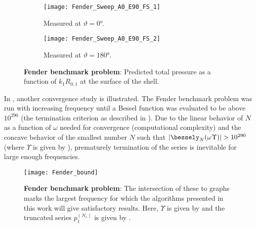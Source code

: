 \begin{figure}
	\centering
	\begin{subfigure}[t]{\textwidth}
		\centering
		\texttt{[image: Fender\_Sweep\_A0\_E90\_FS\_1]}
		\caption{Measured at $\vartheta = \ang{0}$.}
		\label{Fig1:Fender1}
	\end{subfigure}
	\par\bigskip
	\begin{subfigure}[t]{\textwidth}
		\centering
		\texttt{[image: Fender\_Sweep\_A0\_E90\_FS\_2]}
		\caption{Measured at $\vartheta = \ang{180}$.}
		\label{Fig1:Fender2}
	\end{subfigure}
	\caption{\textbf{Fender benchmark problem}: Predicted total pressure as a function of $k_1R_{0,1}$ at the surface of the shell.}
\end{figure}

In , another convergence study is illustrated. The Fender benchmark problem was run with increasing frequency until a Bessel function was evaluated to be above $10^{290}$ (the termination criterion as described in ). Due to the linear behavior of $N$ as a function of $\omega$ needed for convergence (computational complexity) and the concave behavior of the smallest number $N$ such that $|\bessely_N(\omega\Upsilon)|>10^{290}$ (where $\Upsilon$ is given by ), prematurely termination of the series is inevitable for large enough frequencies.
\begin{figure}
	\centering
	\texttt{[image: Fender\_bound]}
		\caption{\textbf{Fender benchmark problem}: The intersection of these to graphs marks the largest frequency for which the algorithms presented in this work will give satisfactory results. Here, $\Upsilon$ is given by  and the truncated series $p_1^{(N_\varepsilon)}$ is given by .}
	\label{Fig1:FenderConvergence}
\end{figure}


